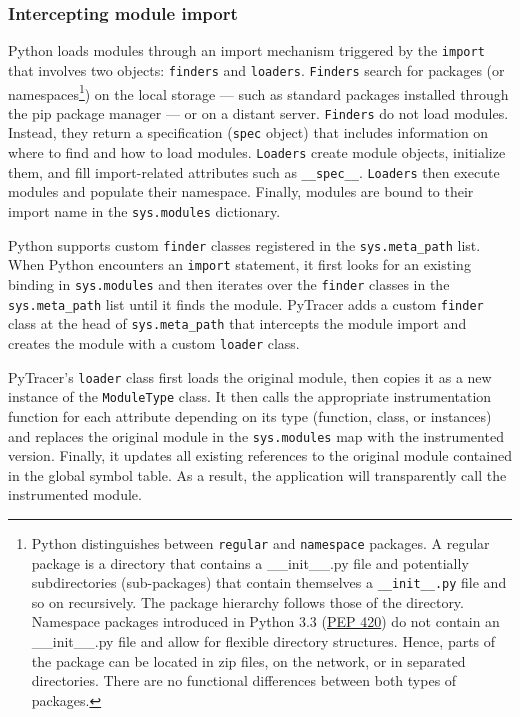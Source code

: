 \documentclass[11pt]{article}
\newcommand{\pytracer}[0]{PyTracer\xspace}
\begin{document}
\subsubsection{Intercepting module import}

Python loads modules through an import mechanism triggered by the \texttt{import} that involves two objects: \texttt{finders} and \texttt{loaders}. \texttt{Finders} search for packages (or 
namespaces\footnote{Python distinguishes between \texttt{regular} and \texttt{namespace} packages.
A regular package is a directory that contains a \_\_init\_\_.py file and potentially subdirectories (sub-packages) 
that contain themselves a \texttt{\_\_init\_\_.py} file and so on recursively. 
The package hierarchy follows those of the directory. 
Namespace packages introduced in Python 3.3 (\href{https://www.python.org/dev/peps/pep-0420/}{PEP 420}) do not contain an
\_\_init\_\_.py file and allow for flexible directory structures. Hence, parts of the package can be located in zip files, on the network, or in separated directories. There are no functional differences between both types of packages.}) on the local storage --- such as standard packages installed through the pip package manager --- or on a distant server.
\texttt{Finders} do not load modules. Instead, they return a specification (\texttt{spec} object) that includes 
information on where to find and how to load modules.
\texttt{Loaders} create module objects, initialize them, and fill import-related attributes 
such as \texttt{\_\_spec\_\_}. 
\texttt{Loaders} then execute modules and populate their namespace. Finally, modules are bound to their import name in the \texttt{sys.modules} dictionary.


Python supports custom \texttt{finder} classes registered in the \texttt{sys.meta\_path} list.
When Python encounters an \texttt{import} statement, it first looks for an existing binding in \texttt{sys.modules} and then iterates over the \texttt{finder} classes in the \texttt{sys.meta\_path} list until it finds the module. \pytracer adds a custom \texttt{finder} class at the head of \texttt{sys.meta\_path} that intercepts
the module import and creates the module with a custom \texttt{loader} class.

\pytracer's \texttt{loader} class first loads the original module, then copies it as a new instance of the \texttt{ModuleType} class. It then calls the appropriate instrumentation function for each attribute depending on its type (function, class, or instances) and replaces the original module in the \texttt{sys.modules} map with the instrumented version. Finally, it updates all existing references to the original module contained in the global symbol table.
As a result, the application will transparently call the instrumented module.
\end{document}
